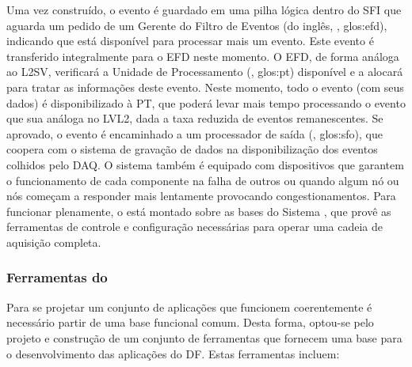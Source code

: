 Uma vez construído, o evento é guardado em uma pilha lógica dentro do SFI que
aguarda um pedido de um Gerente do Filtro de Eventos (do inglês, , \gls{glos:efd}), indicando que está disponível para
processar mais um evento. Este evento é transferido integralmente para o EFD
neste momento. O EFD, de forma análoga ao L2SV, verificará a Unidade de
Processamento (, \gls{glos:pt}) disponível e a alocará
para tratar as informações deste evento. Neste momento, todo o evento (com
seus dados) é disponibilizado à PT, que poderá levar mais tempo processando o
evento que sua análoga no LVL2, dada a taxa reduzida de eventos
remanescentes. Se aprovado, o evento é encaminhado a um processador de saída
(, \gls{glos:sfo}), que coopera com o sistema de gravação
de dados na disponibilização dos eventos colhidos pelo DAQ. O sistema também é
equipado com dispositivos que garantem o funcionamento de cada componente na
falha de outros ou quando algum nó ou nós começam a responder mais lentamente
provocando congestionamentos. Para funcionar plenamente, o  está
montado sobre as bases do Sistema , que provê as ferramentas de
controle e configuração necessárias para operar uma cadeia de aquisição
completa.

\subsubsection{Ferramentas do }
\label{sec:dftools}

Para se projetar um conjunto de aplicações que funcionem coerentemente é
necessário partir de uma base funcional comum. Desta forma, optou-se pelo
projeto e construção de um conjunto de ferramentas que fornecem uma base para
o desenvolvimento das aplicações do DF. Estas ferramentas incluem:

